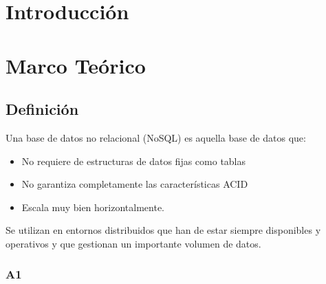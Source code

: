 \documentclass[preprint,12pt]{elsarticle}
\begin{document}



\section{Introducción} 








\section{Marco Teórico}


\subsection {\textbf{Definición}}

Una base de datos no relacional (NoSQL) es aquella base de datos que:

\begin{itemize}
	\item No requiere de estructuras de datos fijas como tablas
	\item No garantiza completamente las características ACID
	\item Escala muy bien horizontalmente.
\end{itemize}

Se utilizan en entornos distribuidos que han de estar siempre disponibles y operativos y que gestionan un importante volumen de datos.


\subsubsection{\textbf{A1}}
\end{document}
